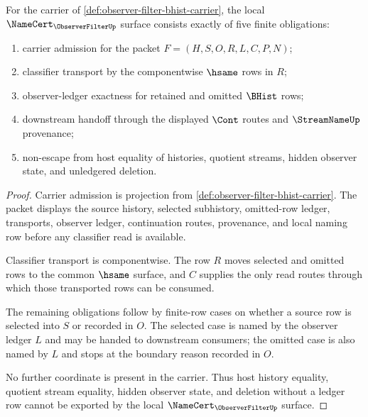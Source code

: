 \begin{theorem}
\label{thm:observer-filter-namecert-obligations}
For the carrier of \autoref{def:observer-filter-bhist-carrier}, the local $\NameCert_{\ObserverFilterUp}$ surface consists exactly of five finite obligations:
\begin{enumerate}
\item carrier admission for the packet $F=(H,S,O,R,L,C,P,N)$;
\item classifier transport by the componentwise $\hsame$ rows in $R$;
\item observer-ledger exactness for retained and omitted $\BHist$ rows;
\item downstream handoff through the displayed $\Cont$ routes and $\StreamNameUp$ provenance;
\item non-escape from host equality of histories, quotient streams, hidden observer state, and unledgered deletion.
\end{enumerate}
\end{theorem}
\begin{proof}
Carrier admission is projection from \autoref{def:observer-filter-bhist-carrier}. The packet displays the source history, selected subhistory, omitted-row ledger, transports, observer ledger, continuation routes, provenance, and local naming row before any classifier read is available.

Classifier transport is componentwise. The row $R$ moves selected and omitted rows to the common $\hsame$ surface, and $C$ supplies the only read routes through which those transported rows can be consumed.

The remaining obligations follow by finite-row cases on whether a source row is selected into $S$ or recorded in $O$. The selected case is named by the observer ledger $L$ and may be handed to downstream consumers; the omitted case is also named by $L$ and stops at the boundary reason recorded in $O$.

No further coordinate is present in the carrier. Thus host history equality, quotient stream equality, hidden observer state, and deletion without a ledger row cannot be exported by the local $\NameCert_{\ObserverFilterUp}$ surface.
\end{proof}

